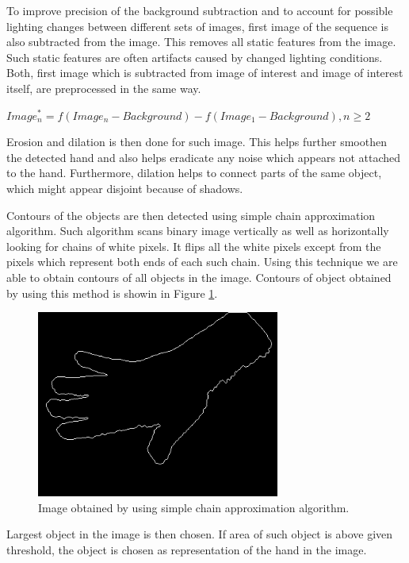 To improve precision of the background subtraction and to account for possible lighting changes between different sets of images, first image of the sequence is also subtracted from the image. This removes all static features from the image. Such static features are often artifacts caused by changed lighting conditions. Both, first image which is subtracted from image of interest and image of interest itself, are preprocessed in the same way.

\begin{math}
Image^*_n = f(Image_n - Background) - f(Image_1 - Background), n \geq 2
\end{math}

Erosion and dilation is then done for such image. This helps further smoothen the detected hand and also helps eradicate any noise which appears not attached to the hand. Furthermore, dilation helps to connect parts of the same object, which might appear disjoint because of shadows.

Contours of the objects are then detected using simple chain approximation algorithm. Such algorithm scans binary image vertically as well as horizontally looking for chains of white pixels. It flips all the white pixels except from the pixels which represent both ends of each such chain. Using this technique we are able to obtain contours of all objects in the image. Contours of object obtained by using this method is showin in Figure \ref{fig:contours}.

\begin{figure}
\begin{center}
\includegraphics[width=80mm]{contours.png}
\caption{Image obtained by using simple chain approximation algorithm.}
\label{fig:contours}
\end{center}
\end{figure}

Largest object in the image is then chosen. If area of such object is above given threshold, the object is chosen as representation of the hand in the image.